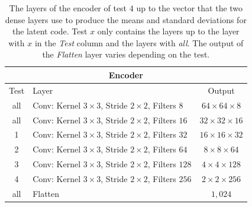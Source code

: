 \begin{center}
    \begin{table}[H] 
        \centering
        \begin{tabular}{ | c | l | c | }
            \multicolumn{3}{c}{Encoder} \\ \hline
            Test &Layer & Output\\ \hline
            all &Conv: Kernel $3\times3$, Stride $2\times2$, Filters $8  $    & $64\times 64\times 8  $    \\  
            all &Conv: Kernel $3\times3$, Stride $2\times2$, Filters $16 $    & $32\times 32\times 16 $    \\
            1   &Conv: Kernel $3\times3$, Stride $2\times2$, Filters $32 $    & $16\times 16\times 32 $    \\
            2   &Conv: Kernel $3\times3$, Stride $2\times2$, Filters $64 $    & $8\times 8\times   64 $    \\
            3   &Conv: Kernel $3\times3$, Stride $2\times2$, Filters $128$    & $4\times 4\times   128$    \\
            4   &Conv: Kernel $3\times3$, Stride $2\times2$, Filters $256$    & $2\times 2\times   256$    \\
            all &Flatten                                                              & $1,024$                    \\
            \hline
        \end{tabular} 
        \caption{The layers of the encoder of test $4$ up to the vector that the two dense layers use to produce 
        the means and standard deviations for the latent code. Test $x$ only contains the layers up to
        the layer with $x$ in the \textit{Test} column and the layers with \textit{all}.
        The output of the \textit{Flatten} layer
        varies depending on the test.} \label{table_encoder_num_conv}
    \end{table}
\end{center}
\vspace{-4em}
